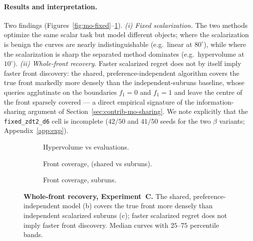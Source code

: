 \paragraph{Results and interpretation.}
Two findings (Figures~\ref{fig:mo-fixed}--\ref{fig:mo-pareto}).
\emph{(i) Fixed scalarization.} The two methods optimize the same scalar task but
model different objects; where the scalarization is benign the curves are nearly
indistinguishable (e.g.\ linear at $80^\circ$), while where the scalarization is
sharp the separated method dominates (e.g.\ hypervolume at $10^\circ$).
\emph{(ii) Whole-front recovery.} Faster scalarized regret does not by itself
imply faster front discovery: the shared, preference-independent
\RIGHT{} algorithm covers the true front markedly more densely than the
independent-subruns baseline, whose queries agglutinate on the boundaries
$f_1=0$ and $f_1=1$ and leave the centre of the front sparsely covered --- a
direct empirical signature of the information-sharing argument of
Section~\ref{sec:contrib-mo-sharing}. We note explicitly that the
\texttt{fixed\_zdt2\_d6} cell is incomplete ($42/50$ and $41/50$ seeds for the two
$\beta$ variants; Appendix~\ref{app:exp}).


\begin{figure}[htbp]
  \centering
  \begin{subfigure}[b]{0.32\linewidth}
    \centering{}
    \caption{Hypervolume vs evaluations.}
  \end{subfigure}\hfill
  \begin{subfigure}[b]{0.32\linewidth}
    \centering{}
    \caption{Front coverage, \RIGHT{} (shared vs subruns).}
  \end{subfigure}\hfill
  \begin{subfigure}[b]{0.32\linewidth}
    \centering{}
    \caption{Front coverage, \WRONG{} subruns.}
  \end{subfigure}
  \caption{\textbf{Whole-front recovery, Experiment~C.} The shared,
  preference-independent model (b) covers the true front more densely than
  independent scalarized subruns (c); faster scalarized regret does not imply
  faster front discovery. Median curves with $25$--$75$ percentile bands.}
  \label{fig:mo-pareto}
\end{figure}
